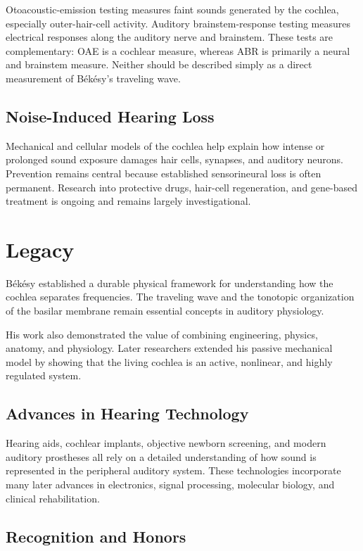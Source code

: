 Otoacoustic-emission testing measures faint sounds generated by the cochlea, especially outer-hair-cell activity. Auditory brainstem-response testing measures electrical responses along the auditory nerve and brainstem. These tests are complementary: OAE is a cochlear measure, whereas ABR is primarily a neural and brainstem measure. Neither should be described simply as a direct measurement of B\'ek\'esy's traveling wave.

\subsection{Noise-Induced Hearing Loss}

Mechanical and cellular models of the cochlea help explain how intense or prolonged sound exposure damages hair cells, synapses, and auditory neurons. Prevention remains central because established sensorineural loss is often permanent. Research into protective drugs, hair-cell regeneration, and gene-based treatment is ongoing and remains largely investigational.

\section{Legacy}

B\'ek\'esy established a durable physical framework for understanding how the cochlea separates frequencies. The traveling wave and the tonotopic organization of the basilar membrane remain essential concepts in auditory physiology.

His work also demonstrated the value of combining engineering, physics, anatomy, and physiology. Later researchers extended his passive mechanical model by showing that the living cochlea is an active, nonlinear, and highly regulated system.

\subsection{Advances in Hearing Technology}

Hearing aids, cochlear implants, objective newborn screening, and modern auditory prostheses all rely on a detailed understanding of how sound is represented in the peripheral auditory system. These technologies incorporate many later advances in electronics, signal processing, molecular biology, and clinical rehabilitation.

\subsection{Recognition and Honors}

